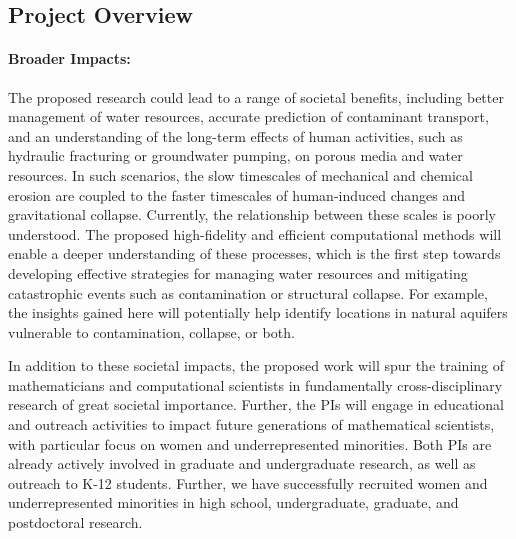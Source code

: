 \documentclass[11pt]{article}
\begin{document}
\subsection{Project Overview}

\paragraph{Broader Impacts:} The proposed research could lead to a range of societal benefits, including better management of water resources, accurate prediction of contaminant transport, and an understanding of the long-term effects of human activities, such as hydraulic fracturing or groundwater pumping, on porous media and water resources. In such scenarios, the slow timescales of mechanical and chemical erosion are coupled to the faster timescales of human-induced changes and gravitational collapse. Currently, the relationship between these scales is poorly understood. The proposed high-fidelity and efficient computational methods will enable a deeper understanding of these processes, which is the first step towards developing effective strategies for managing water resources and mitigating catastrophic events such as contamination or structural collapse. For example, the insights gained here will potentially help identify locations in natural aquifers vulnerable to contamination, collapse, or both. 

In addition to these societal impacts, the proposed work will spur the training of mathematicians and computational scientists in fundamentally cross-disciplinary research of great societal importance. Further, the PIs will engage in educational and outreach activities to impact future generations of mathematical scientists, with particular focus on women and underrepresented minorities. Both PIs are already actively involved in graduate and undergraduate research, as well as outreach to K-12 students. Further, we have successfully recruited women and underrepresented minorities in high school, undergraduate, graduate, and postdoctoral research.  
\end{document}
